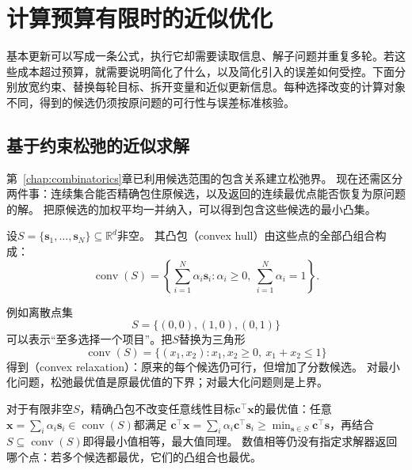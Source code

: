 \section{计算预算有限时的近似优化}
\label{sec:opt-approximate-optimization}

基本更新可以写成一条公式，执行它却需要读取信息、解子问题并重复多轮。若这些成本超过预算，就需要说明简化了什么，以及简化引入的误差如何受控。下面分别放宽约束、替换每轮目标、拆开变量和近似更新信息。每种选择改变的计算对象不同，得到的候选仍须按原问题的可行性与误差标准核验。

\subsection{基于约束松弛的近似求解}
\label{sec:opt-relaxations-certificates}

第~\ref{chap:combinatorics}章已利用候选范围的包含关系建立松弛界。
现在还需区分两件事：连续集合能否精确包住原候选，以及返回的连续最优点能否恢复为原问题的解。
把原候选的加权平均一并纳入，可以得到包含这些候选的最小凸集。

\begin{definition}[有限点集的凸包]
\label{def:opt-convex-hull}
设$S=\{\bm s_1,\ldots,\bm s_N\}\subseteq\mathbb R^d$非空。
其凸包（convex hull）由这些点的全部凸组合构成：
\[
  \operatorname{conv}(S)
  =\left\{\sum_{i=1}^N\alpha_i\bm s_i:
  \alpha_i\geq0,\ \sum_{i=1}^N\alpha_i=1\right\}.
\]
\end{definition}
例如离散点集
\[
  S=\{(0,0),(1,0),(0,1)\}
\]
可以表示“至多选择一个项目”。把$S$替换为三角形
\[
  \operatorname{conv}(S)
  =\{(x_1,x_2):x_1,x_2\geq0,\ x_1+x_2\leq1\}
\]
得到（convex relaxation）：原来的每个候选仍可行，但增加了分数候选。
对最小化问题，松弛最优值是原最优值的下界；对最大化问题则是上界。

对于有限非空$S$，精确凸包不改变任意线性目标$\bm{c}^{\top}\bm{x}$的最优值：任意
$\bm{x}=\sum_i\alpha_i\bm{s}_i\in\operatorname{conv}(S)$都满足
$\bm{c}^{\top}\bm{x}=\sum_i\alpha_i\bm{c}^{\top}\bm{s}_i
\geq\min_{\bm{s}\in S}\bm{c}^{\top}\bm{s}$，再结合
$S\subseteq\operatorname{conv}(S)$即得最小值相等，最大值同理。
数值相等仍没有指定求解器返回哪个点：若多个候选都最优，它们的凸组合也最优。


